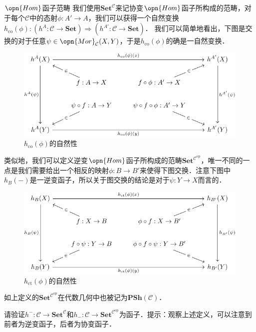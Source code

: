 \begin{definition}{$\opn{Hom}$函子范畴}
我们使用$\mathbf{Set}^\mathcal{C}$来记协变$\opn{Hom}$函子所构成的范畴，对于每个$\mathcal{C}$中的态射$\phi:A'\to A$，我们可以获得一个自然变换$h_{\text{co}}(\phi):(h^A:\mathcal{C}\to\mathbf{Set})\Rightarrow(h^{A'}:\mathcal{C}\to\mathbf{Set})$．
我们可以简单地看出，下图是交换的对于任意$\psi\in\opn{Mor}_\mathcal{C}(X,Y)$，于是$h_\text{co}(\phi)$的确是一自然变换．
\begin{figure}[h!]
\centering
\includegraphics[width=13cm]{./figures/Cat1.pdf}
\caption{$h_{\text{co}}(\phi)$的自然性} \label{Cat_fig1}
\end{figure}
类似地，我们可以定义逆变$\opn{Hom}$函子所构成的范畴$\mathbf{Set}^{\mathcal{C}^\text{op}}$，唯一不同的一点是我们需要给出一个相反的映射$\phi:B\to B'$来使得下图交换．注意下图中$h_B(-)$是一逆变函子，所以关于图交换的结论是对于$\psi:Y\to X$而言的．
\begin{figure}[ht]
\centering
\includegraphics[width=13cm]{./figures/Cat2.pdf}
\caption{$h_{\text{ct}}(\phi)$的自然性} \label{Cat_fig2}
\end{figure}
\end{definition}
如上定义的$\mathbf{Set}^{\mathcal{C}^\text{op}}$在代数几何中也被记为$\mathbf{PSh}(\mathcal{C})$．
\begin{exercise}{}
请验证$h^{-}:\mathcal{C}\to\mathbf{Set}^\mathcal{C}$和$h_{-}:\mathcal{C}\to\mathbf{Set}^{\mathcal{C}^\text{op}}$为函子．提示：观察上述定义，可以注意到前者为逆变函子，后者为协变函子．
\end{exercise}

